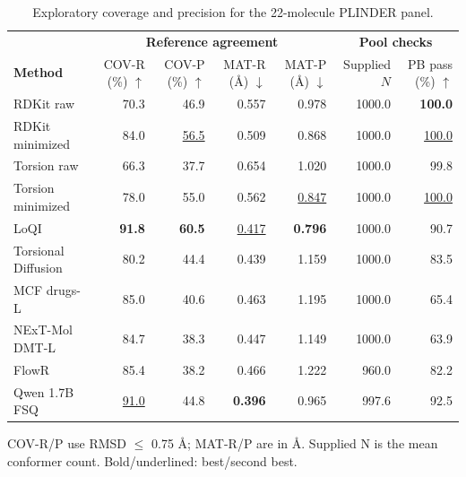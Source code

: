 \begin{table}[htbp]
\centering
\footnotesize
\setlength{\tabcolsep}{2pt}
\renewcommand{\arraystretch}{1.35}
\caption{Exploratory coverage and precision for the 22-molecule PLINDER panel.}
\label{tab:druglike}
\par\smallskip
\begin{tabular*}{\linewidth}{@{\extracolsep{\fill}}lrrrr@{\hspace{10pt}}rr@{}}
\toprule
 & \multicolumn{4}{c}{\textcolor{plinderTeal}{\textbf{Reference agreement}}} & \multicolumn{2}{c}{\textbf{Pool checks}} \\
\cmidrule(lr){2-5}\cmidrule(l){6-7}
\textbf{Method} & \shortstack{COV-R\\(\%) $\uparrow$} & \shortstack{COV-P\\(\%) $\uparrow$} & \shortstack{MAT-R\\(\AA{}) $\downarrow$} & \shortstack{MAT-P\\(\AA{}) $\downarrow$} & Supplied $N$ & \shortstack{PB pass\\(\%) $\uparrow$} \\
\midrule
\rowcolor{tableShade}
RDKit raw & 70.3 & 46.9 & 0.557 & 0.978 & 1000.0 & \textbf{100.0} \\
RDKit minimized & 84.0 & \underline{56.5} & 0.509 & 0.868 & 1000.0 & \underline{100.0} \\
\rowcolor{tableShade}
Torsion raw & 66.3 & 37.7 & 0.654 & 1.020 & 1000.0 & 99.8 \\
Torsion minimized & 78.0 & 55.0 & 0.562 & \underline{0.847} & 1000.0 & \underline{100.0} \\
\rowcolor{tableShade}
LoQI & \textbf{91.8} & \textbf{60.5} & \underline{0.417} & \textbf{0.796} & 1000.0 & 90.7 \\
Torsional Diffusion & 80.2 & 44.4 & 0.439 & 1.159 & 1000.0 & 83.5 \\
\rowcolor{tableShade}
MCF drugs-L & 85.0 & 40.6 & 0.463 & 1.195 & 1000.0 & 65.4 \\
NExT-Mol DMT-L & 84.7 & 38.3 & 0.447 & 1.149 & 1000.0 & 63.9 \\
\rowcolor{tableShade}
FlowR & 85.4 & 38.2 & 0.466 & 1.222 & 960.0 & 82.2 \\
Qwen 1.7B FSQ & \underline{91.0} & 44.8 & \textbf{0.396} & 0.965 & 997.6 & 92.5 \\
\bottomrule
\end{tabular*}
\par\smallskip
\begin{minipage}{\linewidth}
COV-R/P use RMSD $\leq$ 0.75 \AA{}; MAT-R/P are in \AA{}. Supplied N is the mean conformer count. Bold/underlined: best/second best.
\end{minipage}
\end{table}
